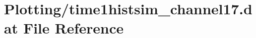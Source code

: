 \hypertarget{Plotting_2time1histsim__channel17_8dat}{}\section{Plotting/time1histsim\+\_\+channel17.dat File Reference}
\label{Plotting_2time1histsim__channel17_8dat}
